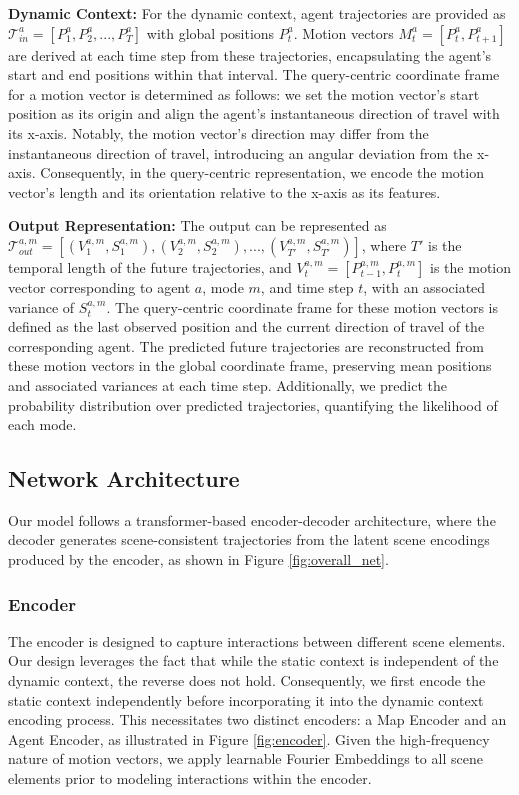 \noindent\textbf{Dynamic Context:} For the dynamic context, agent trajectories are provided as $\mathcal{T}_{in}^a = [P_1^a, P_2^a, ..., P_T^a]$ with global positions $P_t^a$. Motion vectors $M_t^a = [P_t^a, P_{t+1}^a]$ are derived at each time step from these trajectories, encapsulating the agent’s start and end positions within that interval. The query-centric coordinate frame for a motion vector is determined as follows: we set the motion vector’s start position as its origin and align the agent’s instantaneous direction of travel with its x-axis. Notably, the motion vector’s direction may differ from the instantaneous direction of travel, introducing an angular deviation from the x-axis. Consequently, in the query-centric representation, we encode the motion vector’s length and its orientation relative to the x-axis as its features. 

\noindent\textbf{Output Representation:} The output can be represented as  $\mathcal{T}_{out}^{a,m} = [(V_1^{a,m}, S_1^{a,m}), (V_2^{a,m}, S_2^{a,m}), ..., (V_{T'}^{a,m}, S_{T'}^{a,m})]$, where $T'$ is the temporal length of the future trajectories, and $V_t^{a,m} = [P_{t-1}^{a,m}, P_t^{a,m}]$ is the motion vector corresponding to agent $a$, mode $m$, and time step $t$, with an associated variance of $S_t^{a,m}$. The query-centric coordinate frame for these motion vectors is defined as the last observed position and the current direction of travel of the corresponding agent. The predicted future trajectories are reconstructed from these motion vectors in the global coordinate frame, preserving mean positions and associated variances at each time step. Additionally, we predict the probability distribution over predicted trajectories, quantifying the likelihood of each mode.

\subsection{Network Architecture}\label{subsection:network_architecture}
Our model follows a transformer-based encoder-decoder architecture, where the decoder generates scene-consistent trajectories from the latent scene encodings produced by the encoder, as shown in Figure \ref{fig:overall_net}.

\subsubsection{Encoder}\label{subsubsection:encoder}
The encoder is designed to capture interactions between different scene elements. Our design leverages the fact that while the static context is independent of the dynamic context, the reverse does not hold. Consequently, we first encode the static context independently before incorporating it into the dynamic context encoding process. This necessitates two distinct encoders: a Map Encoder and an Agent Encoder, as illustrated in Figure \ref{fig:encoder}. Given the high-frequency nature of motion vectors, we apply learnable Fourier Embeddings \cite{tancik2020fourier} to all scene elements prior to modeling interactions within the encoder.

